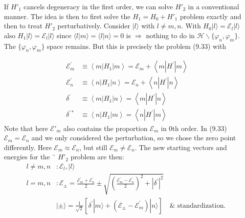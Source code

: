 If $H'_1$ cancels degeneracy in the first order, we can solve $H'_2$ in a conventional manner. The idea is then to first solve the $H_1=H_0+H'_1$ problem exactly and then to treat $H'_2$ perturbatively. Consider $| l\rangle$ with $l \neq m, n.$ With $H_0| l\rangle = \mathcal{E}_l | l\rangle$ also $H_1| l\rangle = \mathcal{E}_l | l\rangle$ since $\langle l | m\rangle = \langle l | n\rangle = 0$ is $\Rightarrow$ nothing to do in $\mathcal{H}\backslash\{\varphi_n,\varphi_m\}$. The $\{\varphi_n,\varphi_m\}$ space remains. But this is precisely the problem (9.33) with

\begin{equation}
\begin{aligned} \mathcal{E}_{m}^{\prime} & \equiv\left\langle m\left|H_{1}\right| m\right\rangle=\mathcal{E}_{m}+\left\langle m\left|H^{\prime}\right| m\right\rangle \\ \mathcal{E}_{n}^{\prime} & \equiv\left\langle n\left|H_{1}\right| n\right\rangle=\mathcal{E}_{n}+\left\langle n\left|H^{\prime}\right| n\right\rangle \\ \delta^{\prime} & \equiv\left\langle m\left|H_{1}\right| n\right\rangle=\left\langle m\left|H^{\prime}\right| n\right\rangle \\ \delta^{\prime *} & \equiv\left\langle n\left|H_{1}\right| m\right\rangle=\left\langle n\left|H^{\prime}\right| m\right\rangle \end{aligned}
\end{equation}
Note that here $\mathcal{E}'_m$ also contains the proportion $\mathcal{E}_m$ in 0th order. In (9.33) $\mathcal{E}_m=\mathcal{E}_n$ and we only considered the perturbation, so we chose the zero point differently. Here  $\mathcal{E}_m\approx\mathcal{E}_n$, but still  $\mathcal{E}_m\neq\mathcal{E}_n$. The new starting vectors and energies for the ¨ $H'_2$ problem are then:
\begin{equation}
\begin{aligned} l \neq m, n &: \mathcal{E}_{l},|l\rangle \\ l=m, n &: \mathcal{E}_{\pm}=\frac{\mathcal{E}_{m}^{\prime}+\mathcal{E}_{n}^{\prime}}{2} \pm \sqrt{\left(\frac{\mathcal{E}_{m}^{\prime}-\mathcal{E}_{n}^{\prime}}{2}\right)^{2}+\left|\delta^{\prime}\right|^{2}} \\ &|\pm\rangle=\frac{1}{\sqrt{2}}\left[\delta^{\prime}|m\rangle+\left(\mathcal{E}_{\pm}-\mathcal{E}_{m}^{\prime}\right)|n\rangle\right] \quad \& \text { standardization. } \end{aligned}
\end{equation}
